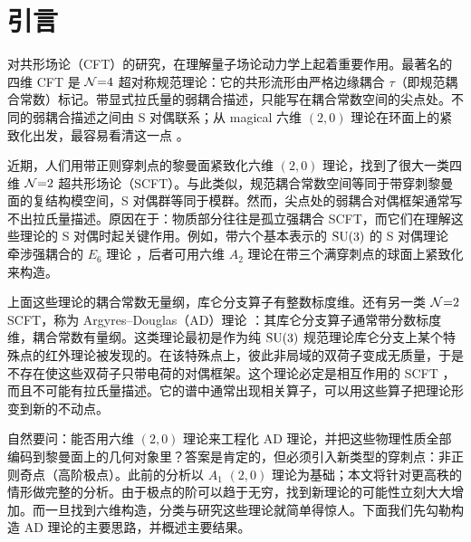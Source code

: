 \section{引言}
\label{sec:intro}

对共形场论（CFT）的研究，在理解量子场论动力学上起着重要作用。最著名的四维 CFT 是 $\mathcal{N}{=}4$ 超对称规范理论：它的共形流形由严格边缘耦合 $\tau$（即规范耦合常数）标记。带显式拉氏量的弱耦合描述，只能写在耦合常数空间的尖点处。不同的弱耦合描述之间由 S 对偶联系；从 magical 六维 $(2,0)$ 理论在环面上的紧致化出发，最容易看清这一点 \cite{1}。


近期，人们用带正则穿刺点的黎曼面紧致化六维 $(2,0)$ 理论，找到了很大一类四维 $\mathcal{N}{=}2$ 超共形场论（SCFT）\cite{2,3}。与此类似，规范耦合常数空间等同于带穿刺黎曼面的复结构模空间，S 对偶群等同于模群。然而，尖点处的弱耦合对偶框架通常写不出拉氏量描述。原因在于：物质部分往往是孤立强耦合 SCFT，而它们在理解这些理论的 S 对偶时起关键作用。例如，带六个基本表示的 $\operatorname{SU}(3)$ 的 S 对偶理论 \cite{4} 牵涉强耦合的 $E_6$ 理论 \cite{5}，后者可用六维 $A_2$ 理论在带三个满穿刺点的球面上紧致化来构造。

上面这些理论的耦合常数无量纲，库仑分支算子有整数标度维。还有另一类 $\mathcal{N}{=}2$ SCFT，称为 Argyres--Douglas（AD）理论 \cite{6}：其库仑分支算子通常带分数标度维，耦合常数有量纲。这类理论最初是作为纯 $\operatorname{SU}(3)$ 规范理论库仑分支上某个特殊点的红外理论被发现的。在该特殊点上，彼此非局域的双荷子变成无质量，于是不存在使这些双荷子只带电荷的对偶框架。这个理论必定是相互作用的 SCFT \cite{6,7}，而且不可能有拉氏量描述。它的谱中通常出现相关算子，可以用这些算子把理论形变到新的不动点。

自然要问：能否用六维 $(2,0)$ 理论来工程化 AD 理论，并把这些物理性质全部编码到黎曼面上的几何对象里？答案是肯定的，但必须引入新类型的穿刺点：非正则奇点（高阶极点）\cite{3}。此前的分析以 $A_1$ $(2,0)$ 理论为基础；本文将针对更高秩的情形做完整的分析。由于极点的阶可以趋于无穷，找到新理论的可能性立刻大大增加。而一旦找到六维构造，分类与研究这些理论就简单得惊人。下面我们先勾勒构造 AD 理论的主要思路，并概述主要结果。


